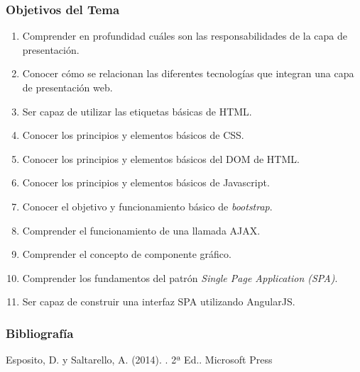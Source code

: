 \documentclass[a4paper,slidestop,xcolor=pst,blue]{beamer}
\begin{document}
\begin{frame}[c]
    \frametitle{Objetivos del Tema}
    \begin{enumerate}[<+->]
         \item Comprender en profundidad cuáles son las responsabilidades de la capa de presentación.
         \item Conocer cómo se relacionan las diferentes tecnologías que integran una capa de presentación web.
         \item Ser capaz de utilizar las etiquetas básicas de HTML.
         \item Conocer los principios y elementos básicos de CSS.
         \item Conocer los principios y elementos básicos del DOM de HTML.
         \item Conocer los principios y elementos básicos de Javascript.
         \item Conocer el objetivo y funcionamiento básico de \emph{bootstrap}.
         \item Comprender el funcionamiento de una llamada AJAX.         
         \item Comprender el concepto de componente gráfico.
         \item Comprender los fundamentos del patrón \emph{Single Page Application (SPA)}.
         \item Ser capaz de construir una interfaz SPA utilizando AngularJS.
    \end{enumerate}
\end{frame}

\begin{frame}[c]
    \frametitle{Bibliografía}
    \begin{thebibliography}{1}

        Esposito, D. y Saltarello, A. (2014).
        . 2ª Ed..
        \newblock Microsoft Press
        
        
        
        
        
        

    \end{thebibliography}
\end{frame}
\end{document}
